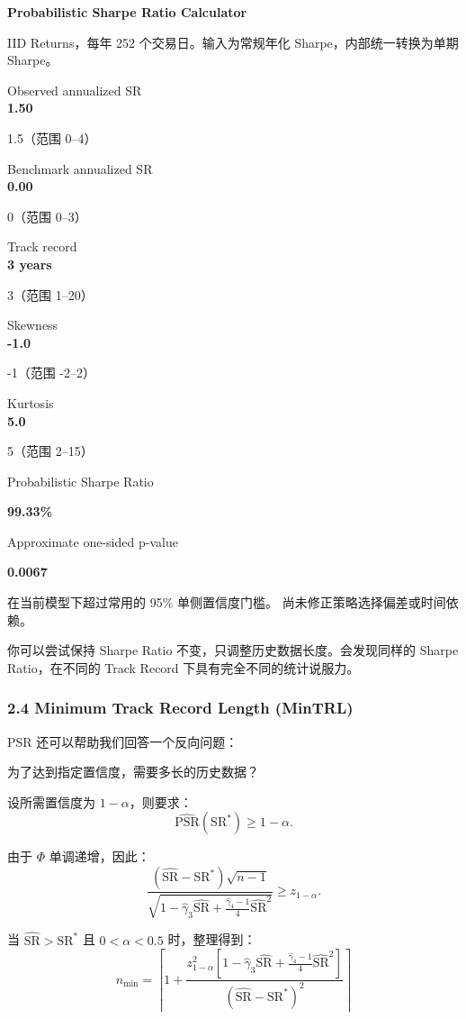 \textbf{Probabilistic Sharpe Ratio Calculator}

IID Returns，每年 252 个交易日。输入为常规年化 Sharpe，内部统一转换为单期 Sharpe。

Observed annualized SR\\
\textbf{1.50}

1.5（范围 0--4）

Benchmark annualized SR\\
\textbf{0.00}

0（范围 0--3）

Track record\\
\textbf{3 years}

3（范围 1--20）

Skewness\\
\textbf{-1.0}

-1（范围 -2--2）

Kurtosis\\
\textbf{5.0}

5（范围 2--15）

Probabilistic Sharpe Ratio

\textbf{99.33\%}

Approximate one-sided p-value

\textbf{0.0067}

在当前模型下超过常用的 95\% 单侧置信度门槛。 尚未修正策略选择偏差或时间依赖。

你可以尝试保持 Sharpe Ratio 不变，只调整历史数据长度。会发现同样的 Sharpe Ratio，在不同的 Track Record 下具有完全不同的统计说服力。

\hypertarget{part-4-71-0001-minimum-track-record-length-mintrl}{%
\subsubsection{2.4 Minimum Track Record Length (MinTRL)}\label{part-4-71-0001-minimum-track-record-length-mintrl}}

PSR 还可以帮助我们回答一个反向问题：

为了达到指定置信度，需要多长的历史数据？

设所需置信度为 \(1-\alpha\)，则要求：
\[\widehat{\mathrm{PSR}}(\mathrm{SR}^*)
\geq1-\alpha.\]

由于 \(\Phi\) 单调递增，因此：
\[\frac{
(\widehat{\mathrm{SR}}-\mathrm{SR}^*)\sqrt{n-1}
}{
\sqrt{
1-\hat\gamma_3\widehat{\mathrm{SR}}
+\frac{\hat\gamma_4-1}{4}
\widehat{\mathrm{SR}}^2
}
}
\geq z_{1-\alpha}.\]

当 \(\widehat{\mathrm{SR}}>\mathrm{SR}^*\) 且 \(0<\alpha<0.5\) 时，整理得到：
\[\boxed{
n_{\min}
=
\left\lceil
1+
\frac{
z_{1-\alpha}^2
\left[
1-\hat\gamma_3\widehat{\mathrm{SR}}
+
\frac{\hat\gamma_4-1}{4}
\widehat{\mathrm{SR}}^2
\right]
}{
(\widehat{\mathrm{SR}}-\mathrm{SR}^*)^2
}
\right\rceil
}\]

